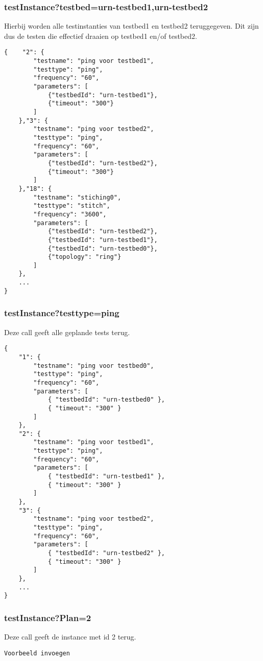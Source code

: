 \subsubsection{testInstance?testbed=urn-testbed1,urn-testbed2}
Hierbij worden alle testinstanties van testbed1 en testbed2 teruggegeven. Dit zijn dus de testen die effectief draaien op testbed1 en/of testbed2.
\begin{verbatim}
{    "2": {
        "testname": "ping voor testbed1",
        "testtype": "ping",
        "frequency": "60",
        "parameters": [
        	{"testbedId": "urn-testbed1"},
            {"timeout": "300"}
        ]
    },"3": {
        "testname": "ping voor testbed2",
        "testtype": "ping",
        "frequency": "60",
        "parameters": [
            {"testbedId": "urn-testbed2"},
            {"timeout": "300"}
        ]
    },"18": {
        "testname": "stiching0",
        "testtype": "stitch",
        "frequency": "3600",
        "parameters": [
            {"testbedId": "urn-testbed2"},
            {"testbedId": "urn-testbed1"},
            {"testbedId": "urn-testbed0"},
            {"topology": "ring"}
        ]
    },	
    ...    
}
\end{verbatim}
\clearpage
\subsubsection{testInstance?testtype=ping}
Deze call geeft alle geplande tests terug.
\begin{verbatim}
{
    "1": {
        "testname": "ping voor testbed0",
        "testtype": "ping",
        "frequency": "60",
        "parameters": [
            { "testbedId": "urn-testbed0" },
            { "timeout": "300" }
        ]
    },
    "2": {
        "testname": "ping voor testbed1",
        "testtype": "ping",
        "frequency": "60",
        "parameters": [
            { "testbedId": "urn-testbed1" },
            { "timeout": "300" }
        ]
    },
    "3": {
        "testname": "ping voor testbed2",
        "testtype": "ping",
        "frequency": "60",
        "parameters": [
            { "testbedId": "urn-testbed2" },
            { "timeout": "300" }
        ]
    },
    ...
}
\end{verbatim}

\subsubsection{testInstance?Plan=2}
Deze call geeft de instance met id 2 terug.
\begin{verbatim}
Voorbeeld invoegen
\end{verbatim}